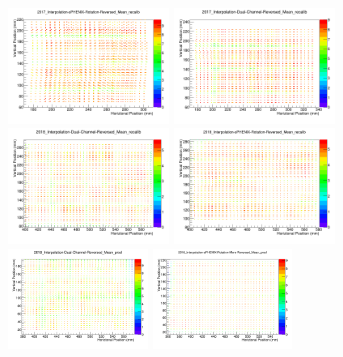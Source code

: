 \documentclass[hidelinks,11pt]{article}
\numberwithin{figure}{section}
\numberwithin{table}{section}
\begin{document}
\begin{figure}[hbtp]
\begin{center}
\includegraphics[width=0.38\textwidth]{Plots/EnpoMeanMethod/EnPo20172ndScan.png}
\includegraphics[width=0.38\textwidth]{Plots/EnpoMeanMethod/EnPo20173rdScan.png}
\includegraphics[width=0.38\textwidth]{Plots/EnpoMeanMethod/EnPo20183rdScan.png}
\includegraphics[width=0.38\textwidth]{Plots/EnpoMeanMethod/EnPo20184thScan.png}
\includegraphics[width=0.33\textwidth]{Plots/EnpoMeanMethod/EnPo20185thScan.png}
\includegraphics[width=0.33\textwidth]{Plots/EnpoMeanMethod/EnPo20186thScan.png}

\end{center}
\end{figure}
\end{document}
